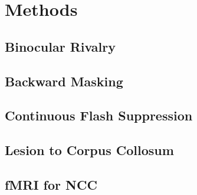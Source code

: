 \section{Methods}


\subsection{Binocular Rivalry}


\subsection{Backward Masking}


\subsection{Continuous Flash Suppression}



\subsection{Lesion to Corpus Collosum}


\subsection{fMRI for NCC}

